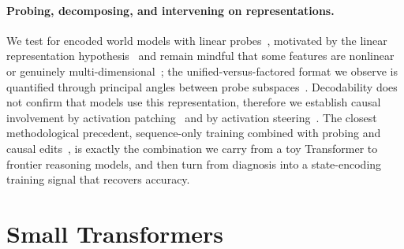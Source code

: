 \documentclass{article} %
\begin{document}
\paragraph{Probing, decomposing, and intervening on representations.}
We test for encoded world models with linear probes~\citep{belinkov2022probing}, motivated by the linear representation hypothesis~\citep{mikolov2013linguistic, park2023linear} and remain mindful that some features are nonlinear or genuinely
multi-dimensional~\citep{csordas2024recurrent, engels2025not}; the unified-versus-factored format we observe is quantified through principal angles between probe subspaces~\citep{bjorck1973numerical}. Decodability does not confirm that models use this representation, therefore we establish causal involvement by activation patching~\citep{vig2020investigating, meng2022locating, wang2022interpretability} and by activation steering~\citep{turner2023steering, subramani2022extracting, hernandez2023inspecting}. The
closest methodological precedent, sequence-only training combined with probing and causal edits~\citep{li2022emergent, spies2025transformers}, is exactly the
combination we carry from a toy Transformer to frontier reasoning models, and then turn from diagnosis into a state-encoding training signal that recovers accuracy.

\section{Small Transformers}
\label{sec:toy}


\end{document}
